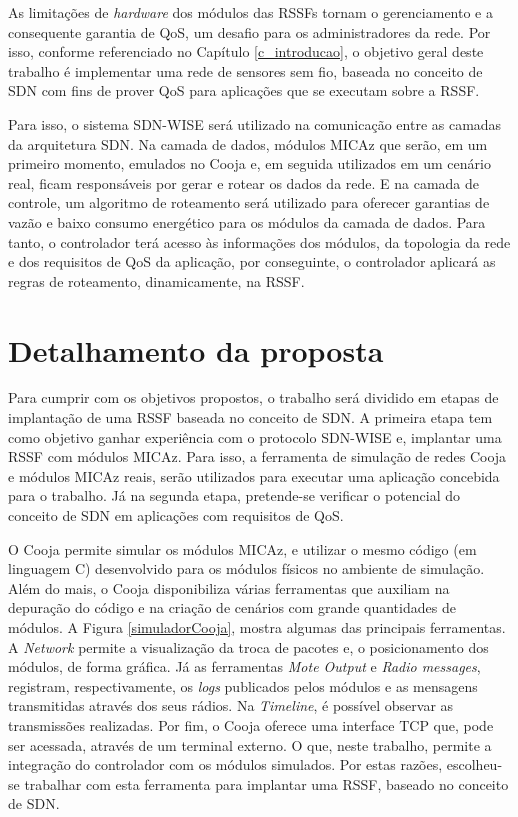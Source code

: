 As limitações de \textit{hardware} dos módulos das \ac{RSSF}s tornam o gerenciamento e a consequente garantia de \ac{QoS}, um desafio para os administradores da rede. Por isso, conforme referenciado no Capítulo \ref{c_introducao}, o objetivo geral deste trabalho é implementar uma rede de sensores sem fio, baseada no conceito de \ac{SDN} com fins de prover \ac{QoS} para aplicações que se executam sobre a \ac{RSSF}.

Para isso, o sistema \ac{SDN-WISE} será utilizado na comunicação entre as camadas da arquitetura \ac{SDN}. Na camada de dados, módulos MICAz que serão, em um primeiro momento, emulados no Cooja e, em seguida utilizados em um cenário real, ficam responsáveis por gerar e rotear os dados da rede. E na camada de controle, um algoritmo de roteamento será utilizado para oferecer garantias de vazão e baixo consumo energético para os módulos da camada de dados. Para tanto, o controlador terá acesso às informações dos módulos, da topologia da rede e dos requisitos de \ac{QoS} da aplicação, por conseguinte, o controlador aplicará as regras de roteamento, dinamicamente, na \ac{RSSF}.

\section{Detalhamento da proposta}

Para cumprir com os objetivos propostos, o trabalho será dividido em etapas de implantação de uma \ac{RSSF} baseada no conceito de \ac{SDN}. A primeira etapa tem como objetivo ganhar experiência com o protocolo \ac{SDN-WISE} e, implantar uma \ac{RSSF} com módulos MICAz. Para isso, a ferramenta de simulação de redes Cooja e módulos MICAz reais, serão utilizados para executar uma aplicação concebida para o trabalho. Já na segunda etapa, pretende-se verificar o potencial do conceito de \ac{SDN} em aplicações com requisitos de \ac{QoS}.

O Cooja permite simular os módulos MICAz, e utilizar o mesmo código (em linguagem C) desenvolvido para os módulos físicos no ambiente de simulação. Além do mais, o Cooja disponibiliza várias ferramentas que auxiliam na depuração do código e na criação de cenários com grande quantidades de módulos. A Figura \ref{simuladorCooja}, mostra algumas das principais ferramentas. A \textit{Network} permite a visualização da troca de pacotes e, o posicionamento dos módulos, de forma gráfica. Já as ferramentas \textit{Mote Output} e \textit{Radio messages}, registram, respectivamente, os \textit{logs} publicados pelos módulos e as mensagens transmitidas através dos seus rádios. Na \textit{Timeline}, é possível observar as transmissões realizadas. Por fim, o Cooja oferece uma interface \ac{TCP} que, pode ser acessada, através de um terminal externo. O que, neste trabalho, permite a integração do controlador com os módulos simulados. Por estas razões, escolheu-se trabalhar com esta ferramenta para implantar uma \ac{RSSF}, baseado no conceito de \ac{SDN}.

